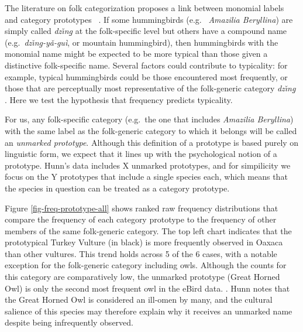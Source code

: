\documentclass[10pt,letterpaper]{article}
\begin{document}
The literature on folk categorization proposes a link between monomial labels and category prototypes
~\cite{berlin1972speculations,berlin2014ethnobiological}. If some hummingbirds (e.g.\ \emph{ Amazilia Beryllina}) are simply called \textit{dz\v{\i}n\b{g}} at the folk-specific level but others have a compound name (e.g.\ \textit{dz\v{\i}n\b{g}-y\v{a}-gu\`{i}}, or mountain hummingbird), then hummingbirds with the monomial name might be expected to be more typical than those given a distinctive folk-specific name. Several factors could contribute to typicality: for example, typical hummingbirds could be those encountered most frequently, or those that are perceptually most representative of the folk-generic category 
\textit{dz\v{\i}n\b{g}} \cite{berlin2014ethnobiological}.  Here we test the hypothesis that frequency predicts typicality.

For us, any folk-specific category (e.g.\ the one that includes \emph{ Amazilia Beryllina}) with the same label as the folk-generic category to which it belongs will be called an \emph{unmarked prototype}.  Although this definition of a prototype is based purely on linguistic form, we expect that it lines up with the psychological notion of a prototype. Hunn's data includes X unmarked prototypes, and for simpilicity we focus on the Y prototypes that include a single species each, which means that the species in question can be treated as a category prototype.

Figure \ref{fig-freq-prototype-all} shows ranked raw frequency distributions that compare the frequency of each category prototype to the frequency of other members of the same folk-generic category. 
The top left chart indicates that the prototypical Turkey Vulture (in black) is more frequently observed in Oaxaca than other vultures. This trend holds across 5 of the 6 cases, with a notable exception for the folk-generic category including owls. Although the counts for this category are comparatively low, the unmarked prototype (Great Horned Owl) is only the second most frequent owl in the eBird data. . Hunn notes that the Great Horned Owl is considered an ill-omen by many, and the cultural salience of this species may therefore explain why it receives an unmarked name despite being infrequently observed. 

\end{document}
